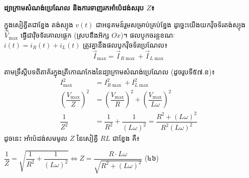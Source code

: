 \vspace{0.5em}
\noindent
\textbf{ដ្យាក្រាមសំណង់ប្រេណែល និងការទាញរកអាំប៉េដង់សរុប $Z$៖}

\noindent
ក្នុងសៀគ្វីតជាខ្នែង តង់ស្យុង $v(t)$ ជាអនុគមន៍រួមសម្រាប់គ្រប់ខ្នែង ដូច្នេះយើងយកវ៉ិចទ័រតង់ស្យុង $\vec{V}_{\max}$ ធ្វើជាវ៉ិចទ័រគោលផ្ដេក (ស្របនឹងអ័ក្ស $Ox$)។ ផលបូកចរន្តខណៈ $i(t) = i_R(t) + i_L(t)$ ត្រូវគ្នានឹងផលបូកវ៉ិចទ័រប្រេណែល៖
\[ \vec{I}_{\max} = \vec{I}_{R\max} + \vec{I}_{L\max} \]

\vspace{0.2em}
\noindent
\begin{minipage}[c]{0.56\textwidth}
	\vspace{0pt}
	\raggedright
	តាមទ្រឹស្តីបទពីតាគ័រក្នុងត្រីកោណកែងនៃដ្យាក្រាមសំណង់ប្រេណែល (ដូចរូបទី៥៧.ខ)៖
	\begin{align*}
		I_{\max}^2 &= I_{R\max}^2 + I_{L\max}^2 \\
		\left(\dfrac{V_{\max}}{Z}\right)^2 &= \left(\dfrac{V_{\max}}{R}\right)^2 + \left(\dfrac{V_{\max}}{L\omega}\right)^2 \\
		\dfrac{1}{Z^2} &= \dfrac{1}{R^2} + \dfrac{1}{(L\omega)^2} = \dfrac{R^2 + (L\omega)^2}{R^2 (L\omega)^2}
	\end{align*}
	ដូចនេះ អាំប៉េដង់សមមូល $Z$ នៃសៀគ្វី $RL$ ជាខ្នែង គឺ៖
	\begin{center}
		$\boxed{\dfrac{1}{Z} = \sqrt{\dfrac{1}{R^2} + \dfrac{1}{(L\omega)^2}} \iff Z = \dfrac{R \cdot L\omega}{\sqrt{R^2 + (L\omega)^2}}}$ \quad (៤៦)
	\end{center}
\end{minipage}%
\hfill
